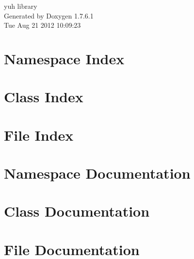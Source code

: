 \documentclass[a4paper]{book}
\begin{document}
\hypersetup{pageanchor=false,citecolor=blue}
\begin{titlepage}
\vspace*{7cm}
\begin{center}
{\Large yuh library }\\
\vspace*{1cm}
{\large \-Generated by Doxygen 1.7.6.1}\\
\vspace*{0.5cm}
{\small Tue Aug 21 2012 10:09:23}\\
\end{center}
\end{titlepage}
\clearemptydoublepage
{}
\tableofcontents
\clearemptydoublepage
{}
\hypersetup{pageanchor=true,citecolor=blue}
\chapter{\-Namespace \-Index}

\chapter{\-Class \-Index}

\chapter{\-File \-Index}

\chapter{\-Namespace \-Documentation}


\chapter{\-Class \-Documentation}




\chapter{\-File \-Documentation}






\printindex
\end{document}
